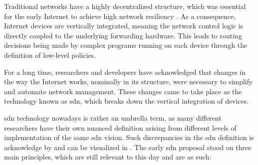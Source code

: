 Traditional networks have a highly decentralized structure, which was essential for the early Internet to achieve high network resiliency \cite{kreutz_software-defined_2015}. As a consequence, Internet devices are vertically integrated, meaning the network control logic is directly coupled to the underlying forwarding hardware. This leads to routing decisions being made by complex programs running on each device through the definition of low-level policies. \cite{bifulco_survey_2018}

For a long time, researchers and developers have acknowledged that changes in the way the Internet works, nominally in its structure, were necessary to simplify and automate network management. These changes came to take place as the technology known as \gls{sdn}, which breaks down the vertical integration of devices.  \cite{thyagaturu_software_2016}

\gls{sdn} technology nowadays is rather an umbrella term, as many different researchers have their own nuanced definition arising from different levels of implementation of the same \gls{sdn} vision. Such discrepancies in the \gls{sdn} definition is acknowledge by \cite{peterson_software-defined_2021} and can be visualized in \cite{feamster_road_2013} \cite{thyagaturu_software_2016} \cite{nunes_survey_2014} \cite{bifulco_survey_2018}.
The early \gls{sdn} proposal stood on three main principles, which are still relevant to this day and are as such:

